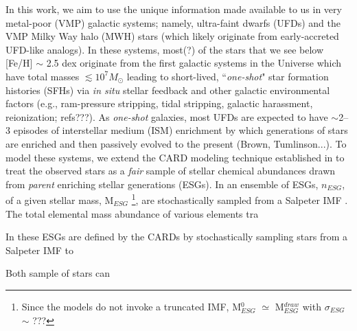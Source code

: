 In this work, we aim to use the unique information made available to us in very metal-poor (VMP) galactic systems; namely, ultra-faint dwarfs (UFDs) and the VMP Milky Way halo (MWH) stars (which likely originate from early-accreted UFD-like analogs). In these systems, most(?) of the stars that we see below [Fe/H] $\sim$ 2.5 dex originate from the first galactic systems in the Universe which have total masses $\lesssim10^7 M_\odot$ leading to short-lived, ``{\it one-shot}" star formation histories (SFHs) via {\it in situ} stellar feedback and other galactic environmental factors (e.g., ram-pressure stripping, tidal stripping, galactic harassment, reionization; refs???). As {\it one-shot} galaxies, most UFDs are expected to have $\sim$2--3 episodes of interstellar medium (ISM) enrichment by which generations of stars are enriched and then passively evolved to the present (Brown, Tumlinson...). To model these systems, we extend the CARD modeling technique established in \cite{Lee_2013} to treat the observed stars as a {\it fair} sample of stellar chemical abundances drawn from {\it parent} enriching stellar generations (ESGs). In \cite{Lee_2013} an ensemble of ESGs, $n_{ESG}$, of a given stellar mass, M$_{ESG}$
\footnote{Since the models do not invoke a truncated IMF, M$_{ESG}^0$ $\simeq$ M$_{ESG}^{draw}$ with $\sigma_{ESG}$ $\sim$ ???}, 
are stochastically sampled from a Salpeter IMF \citep{Salpeter_1955}. The total elemental mass abundance of various elements tra


In \cite{Lee_2013} these ESGs are defined by the CARDs by stochastically sampling stars from a Salpeter IMF \citep{Salpeter_1955} to    

Both sample of stars can 